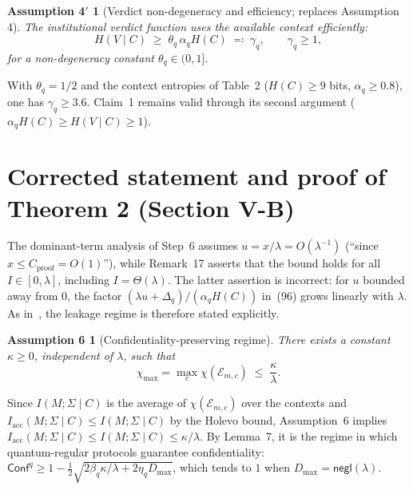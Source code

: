 \documentclass[10pt,a4paper]{article}
\newtheorem*{assumptionFourP}{Assumption 4$'$}
\newtheorem*{assumptionSix}{Assumption 6}
\theoremstyle{remark}
\newcommand{\Confq}{\mathsf{Conf}^q}
\newcommand{\negl}{\mathsf{negl}}
\newcommand{\IMS}{I(M;\Sigma\mid C)}
\newcommand{\Iacc}{I_{\mathrm{acc}}(M;\Sigma\mid C)}
\begin{document}
\begin{assumptionFourP}[Verdict non-degeneracy and efficiency; replaces Assumption 4]
The institutional verdict function uses the available context efficiently:
\begin{equation*}\tag{57$'$}\label{eq:eff}
H(V\mid C)\;\ge\;\theta_q\,\alpha_q H(C)\;\eqqcolon\;\gamma_q,
\qquad \gamma_q\ge 1,
\end{equation*}
for a non-degeneracy constant $\theta_q\in(0,1]$.
\end{assumptionFourP}

\noindent With $\theta_q=1/2$ and the context entropies of Table~2
($H(C)\ge 9$ bits, $\alpha_q\ge 0.8$), one has $\gamma_q\ge 3.6$.
Claim~1 remains valid through its second argument
($\alpha_qH(C)\ge H(V\mid C)\ge 1$).

\section{Corrected statement and proof of Theorem 2 (Section V-B)}

The dominant-term analysis of Step~6 assumes $u=x/\lambda=O(\lambda^{-1})$
(``since $x\le C_{\mathrm{proof}}=O(1)$''), while Remark~17 asserts that the
bound holds for all $I\in[0,\lambda]$, including $I=\Theta(\lambda)$. The
latter assertion is incorrect: for $u$ bounded away from $0$, the factor
$(\lambda u+\Delta_q)/(\alpha_qH(C))$ in~(96) grows linearly with $\lambda$.
As in~\cite{cor1}, the leakage regime is therefore stated explicitly.

\begin{assumptionSix}[Confidentiality-preserving regime]
There exists a constant $\kappa\ge 0$, independent of $\lambda$, such that
\begin{equation*}\tag{59$'$}\label{eq:regime}
\chi_{\max}=\max_{c}\chi(\mathcal E_{m,c})\;\le\;\frac{\kappa}{\lambda}.
\end{equation*}
\end{assumptionSix}

\noindent Since $\IMS$ is the average of $\chi(\mathcal E_{m,c})$ over the
contexts and $\Iacc\le\IMS$ by the Holevo bound, Assumption~6 implies
$\Iacc\le\IMS\le\kappa/\lambda$. By Lemma~7, it is the regime in which
quantum-regular protocols guarantee confidentiality:
$\Confq\ge1-\tfrac12\sqrt{2\beta_q\kappa/\lambda+2\eta_qD_{\max}}$, which tends
to $1$ when $D_{\max}=\negl(\lambda)$.
\end{document}
